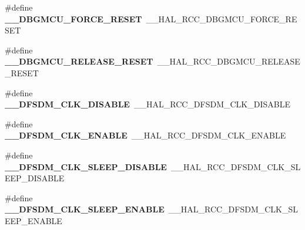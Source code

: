 \begin{DoxyCompactItemize}
\item 
\#define {\bfseries \+\_\+\+\_\+\+D\+B\+G\+M\+C\+U\+\_\+\+F\+O\+R\+C\+E\+\_\+\+R\+E\+S\+ET}~\+\_\+\+\_\+\+H\+A\+L\+\_\+\+R\+C\+C\+\_\+\+D\+B\+G\+M\+C\+U\+\_\+\+F\+O\+R\+C\+E\+\_\+\+R\+E\+S\+ET\hypertarget{group___h_a_l___r_c_c___aliased_gad77740fa4597914c4cd28b6b322ea714}{}\label{group___h_a_l___r_c_c___aliased_gad77740fa4597914c4cd28b6b322ea714}

\item 
\#define {\bfseries \+\_\+\+\_\+\+D\+B\+G\+M\+C\+U\+\_\+\+R\+E\+L\+E\+A\+S\+E\+\_\+\+R\+E\+S\+ET}~\+\_\+\+\_\+\+H\+A\+L\+\_\+\+R\+C\+C\+\_\+\+D\+B\+G\+M\+C\+U\+\_\+\+R\+E\+L\+E\+A\+S\+E\+\_\+\+R\+E\+S\+ET\hypertarget{group___h_a_l___r_c_c___aliased_ga48cf864f29a3c9a1bd73664291824538}{}\label{group___h_a_l___r_c_c___aliased_ga48cf864f29a3c9a1bd73664291824538}

\item 
\#define {\bfseries \+\_\+\+\_\+\+D\+F\+S\+D\+M\+\_\+\+C\+L\+K\+\_\+\+D\+I\+S\+A\+B\+LE}~\+\_\+\+\_\+\+H\+A\+L\+\_\+\+R\+C\+C\+\_\+\+D\+F\+S\+D\+M\+\_\+\+C\+L\+K\+\_\+\+D\+I\+S\+A\+B\+LE\hypertarget{group___h_a_l___r_c_c___aliased_ga7cc3dfa13e529c36891e9fda56d63e08}{}\label{group___h_a_l___r_c_c___aliased_ga7cc3dfa13e529c36891e9fda56d63e08}

\item 
\#define {\bfseries \+\_\+\+\_\+\+D\+F\+S\+D\+M\+\_\+\+C\+L\+K\+\_\+\+E\+N\+A\+B\+LE}~\+\_\+\+\_\+\+H\+A\+L\+\_\+\+R\+C\+C\+\_\+\+D\+F\+S\+D\+M\+\_\+\+C\+L\+K\+\_\+\+E\+N\+A\+B\+LE\hypertarget{group___h_a_l___r_c_c___aliased_ga6ceaf4bc0064de3b57614a5c306b5d33}{}\label{group___h_a_l___r_c_c___aliased_ga6ceaf4bc0064de3b57614a5c306b5d33}

\item 
\#define {\bfseries \+\_\+\+\_\+\+D\+F\+S\+D\+M\+\_\+\+C\+L\+K\+\_\+\+S\+L\+E\+E\+P\+\_\+\+D\+I\+S\+A\+B\+LE}~\+\_\+\+\_\+\+H\+A\+L\+\_\+\+R\+C\+C\+\_\+\+D\+F\+S\+D\+M\+\_\+\+C\+L\+K\+\_\+\+S\+L\+E\+E\+P\+\_\+\+D\+I\+S\+A\+B\+LE\hypertarget{group___h_a_l___r_c_c___aliased_ga246eaf4f4f43fdb80ff77317ee626601}{}\label{group___h_a_l___r_c_c___aliased_ga246eaf4f4f43fdb80ff77317ee626601}

\item 
\#define {\bfseries \+\_\+\+\_\+\+D\+F\+S\+D\+M\+\_\+\+C\+L\+K\+\_\+\+S\+L\+E\+E\+P\+\_\+\+E\+N\+A\+B\+LE}~\+\_\+\+\_\+\+H\+A\+L\+\_\+\+R\+C\+C\+\_\+\+D\+F\+S\+D\+M\+\_\+\+C\+L\+K\+\_\+\+S\+L\+E\+E\+P\+\_\+\+E\+N\+A\+B\+LE\hypertarget{group___h_a_l___r_c_c___aliased_ga6f4f605ead06c11755915994afd63063}{}\label{group___h_a_l___r_c_c___aliased_ga6f4f605ead06c11755915994afd63063}


\end{DoxyCompactItemize}
